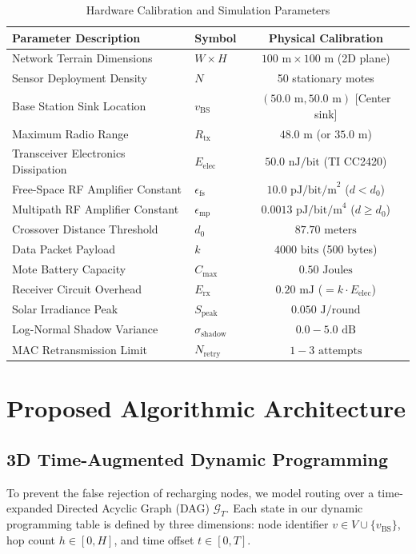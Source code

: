\documentclass[journal]{IEEEtran}
\begin{document}
\begin{table}[!t]
\caption{Hardware Calibration and Simulation Parameters}
\label{tab:params}
\centering
\begin{tabular}{@{}llc@{}}
\toprule
\textbf{Parameter Description} & \textbf{Symbol} & \textbf{Physical Calibration} \\
\midrule
Network Terrain Dimensions & $W \times H$ & $100\text{ m} \times 100\text{ m}$ (2D plane) \\
Sensor Deployment Density & $N$ & 50 stationary motes \\
Base Station Sink Location & $v_{\text{BS}}$ & $(50.0\text{ m}, 50.0\text{ m})$ [Center sink] \\
Maximum Radio Range & $R_{\text{tx}}$ & $48.0\text{ m}$ (or $35.0\text{ m}$) \\
Transceiver Electronics Dissipation & $E_{\text{elec}}$ & $50.0\text{ nJ/bit}$ (TI CC2420) \\
Free-Space RF Amplifier Constant & $\epsilon_{\text{fs}}$ & $10.0\text{ pJ/bit/m}^2$ ($d < d_0$) \\
Multipath RF Amplifier Constant & $\epsilon_{\text{mp}}$ & $0.0013\text{ pJ/bit/m}^4$ ($d \ge d_0$) \\
Crossover Distance Threshold & $d_0$ & $87.70\text{ meters}$ \\
Data Packet Payload & $k$ & $4000\text{ bits}$ (500 bytes) \\
Mote Battery Capacity & $C_{\text{max}}$ & $0.50\text{ Joules}$ \\
Receiver Circuit Overhead & $E_{\text{rx}}$ & $0.20\text{ mJ}$ ($= k \cdot E_{\text{elec}}$) \\
Solar Irradiance Peak & $S_{\text{peak}}$ & $0.050\text{ J/round}$ \\
Log-Normal Shadow Variance & $\sigma_{\text{shadow}}$ & $0.0 - 5.0\text{ dB}$ \\
MAC Retransmission Limit & $N_{\text{retry}}$ & $1 - 3\text{ attempts}$ \\
\bottomrule
\end{tabular}
\end{table}

\section{Proposed Algorithmic Architecture}

\subsection{3D Time-Augmented Dynamic Programming}
To prevent the false rejection of recharging nodes, we model routing over a time-expanded Directed Acyclic Graph (DAG) $\mathcal{G}_T$. Each state in our dynamic programming table is defined by three dimensions: node identifier $v \in V \cup \{v_{\text{BS}}\}$, hop count $h \in [0, H]$, and time offset $t \in [0, T]$.
\end{document}
